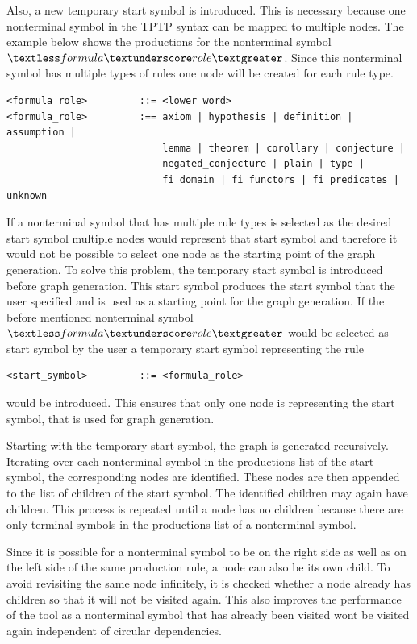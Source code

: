 Also, a new temporary start symbol is introduced.
This is necessary because one nonterminal symbol in the TPTP syntax can be mapped to multiple nodes.
The example below shows the productions for the nonterminal symbol $\textless formula\textunderscore role\textgreater$.
Since this nonterminal symbol has multiple types of rules one node will be created for each rule type.

\begin{verbatim}
<formula_role>         ::= <lower_word>
<formula_role>         :== axiom | hypothesis | definition | assumption |
                           lemma | theorem | corollary | conjecture |
                           negated_conjecture | plain | type |
                           fi_domain | fi_functors | fi_predicates | unknown
\end{verbatim}

If a nonterminal symbol that has multiple rule types is selected as the desired start symbol multiple nodes would represent that start symbol and therefore it would not be possible to select one node as the starting point of the graph generation.
To solve this problem, the temporary start symbol is introduced before graph generation.
This start symbol produces the start symbol that the user specified and is used as a starting point for the graph generation.
If the before mentioned nonterminal symbol $\textless formula\textunderscore role\textgreater$ would be selected as start symbol by the user a temporary start symbol representing the rule
\begin{verbatim}
<start_symbol>         ::= <formula_role>
\end{verbatim}
would be introduced.
This ensures that only one node is representing the start symbol, that is used for graph generation.

Starting with the temporary start symbol, the graph is generated recursively. Iterating over each nonterminal symbol in the productions list of the start symbol, the corresponding nodes are identified. These nodes are then appended to the list of children of the start symbol. The identified children may again have children. This process is repeated until a node has no children because there are only terminal symbols in the productions list of a nonterminal symbol.

Since it is possible for a nonterminal symbol to be on the right side as well as on the left side of the same production rule, a node can also be its own child. To avoid revisiting the same node infinitely, it is checked whether a node already has children so that it will not be visited again. This also improves the performance of the tool as a nonterminal symbol that has already been visited wont be visited again independent of circular dependencies.

